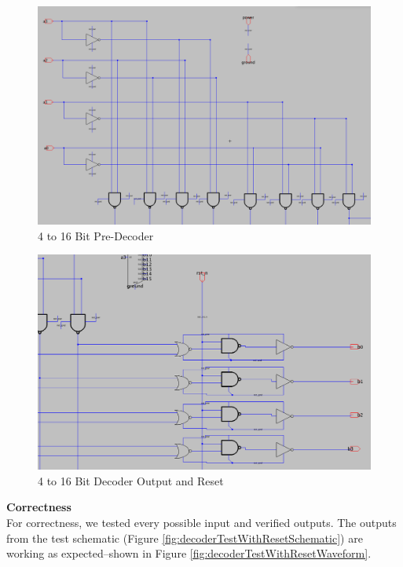 \documentclass[a4paper]{article}
\begin{document}
\begin{figure}[H]
	\centering
	\includegraphics[scale=0.25]{decoderSchematicPreDecoder}
	\caption{4 to 16 Bit Pre-Decoder}
	\label{fig:decoderSchematicPreDecoder}
\end{figure}

\begin{figure}[H]
	\centering
	\includegraphics[scale=0.3]{decoderSchematicReset}
	\caption{4 to 16 Bit Decoder Output and Reset}
	\label{fig:decoderSchematicReset}
\end{figure}

\textbf{Correctness}\\
For correctness, we tested every possible input and verified outputs. The outputs from the test schematic (Figure \ref{fig:decoderTestWithResetSchematic}) are working as expected--shown in Figure \ref{fig:decoderTestWithResetWaveform}. 
\end{document}
